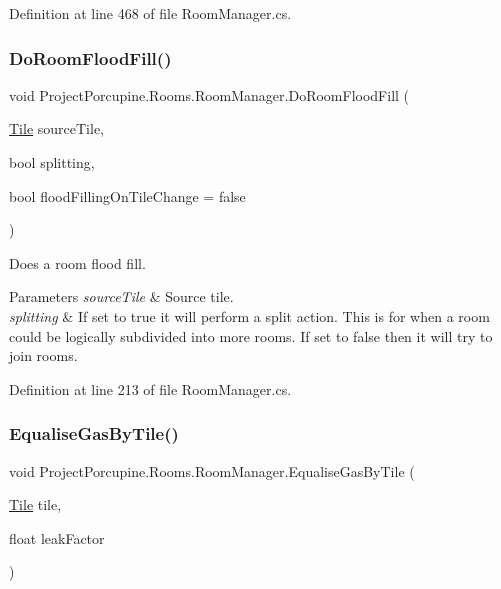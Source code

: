 Definition at line 468 of file Room\+Manager.\+cs.

\mbox{\label{class_project_porcupine_1_1_rooms_1_1_room_manager_ac89dba8cf93ba78cc19e51d8ed948eae}} 
\subsubsection{\texorpdfstring{Do\+Room\+Flood\+Fill()}{DoRoomFloodFill()}}
{\footnotesize\ttfamily void Project\+Porcupine.\+Rooms.\+Room\+Manager.\+Do\+Room\+Flood\+Fill (\begin{DoxyParamCaption}\item[{\hyperlink{class_tile}{Tile}}]{source\+Tile,  }\item[{bool}]{splitting,  }\item[{bool}]{flood\+Filling\+On\+Tile\+Change = {\ttfamily false} }\end{DoxyParamCaption})}



Does a room flood fill. 


\begin{DoxyParams}{Parameters}
{\em source\+Tile} & Source tile.\\
\hline
{\em splitting} & If set to {\ttfamily true} it will perform a split action. This is for when a room could be logically subdivided into more rooms. If set to {\ttfamily false} then it will try to join rooms.\\
\hline
\end{DoxyParams}


Definition at line 213 of file Room\+Manager.\+cs.

\mbox{\label{class_project_porcupine_1_1_rooms_1_1_room_manager_a2d73aa65d42b9cedebe790024f6abf68}} 
\subsubsection{\texorpdfstring{Equalise\+Gas\+By\+Tile()}{EqualiseGasByTile()}}
{\footnotesize\ttfamily void Project\+Porcupine.\+Rooms.\+Room\+Manager.\+Equalise\+Gas\+By\+Tile (\begin{DoxyParamCaption}\item[{\hyperlink{class_tile}{Tile}}]{tile,  }\item[{float}]{leak\+Factor }\end{DoxyParamCaption})}



